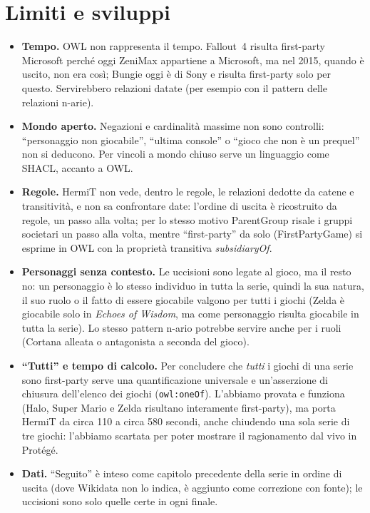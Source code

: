 \documentclass[10pt,a4paper]{article}
\newcommand{\cls}[1]{\textsf{#1}}
\newcommand{\prop}[1]{\textit{#1}}
\begin{document}
\section{Limiti e sviluppi}
\begin{itemize}
  \item \textbf{Tempo.} OWL non rappresenta il tempo. Fallout~4 risulta first-party Microsoft perché oggi ZeniMax appartiene a Microsoft, ma nel 2015, quando è uscito, non era così; Bungie oggi è di Sony e risulta first-party solo per questo. Servirebbero relazioni datate (per esempio con il pattern delle relazioni n-arie).
  \item \textbf{Mondo aperto.} Negazioni e cardinalità massime non sono controlli: ``personaggio non giocabile'', ``ultima console'' o ``gioco che non è un prequel'' non si deducono. Per vincoli a mondo chiuso serve un linguaggio come SHACL, accanto a OWL.
  \item \textbf{Regole.} HermiT non vede, dentro le regole, le relazioni dedotte da catene e transitività, e non sa confrontare date: l'ordine di uscita è ricostruito da regole, un passo alla volta; per lo stesso motivo \textsf{ParentGroup} risale i gruppi societari un passo alla volta, mentre ``first-party'' da solo (\cls{FirstPartyGame}) si esprime in OWL con la proprietà transitiva \prop{subsidiaryOf}.
  \item \textbf{Personaggi senza contesto.} Le uccisioni sono legate al gioco, ma il resto no: un personaggio è lo stesso individuo in tutta la serie, quindi la sua natura, il suo ruolo o il fatto di essere giocabile valgono per tutti i giochi (Zelda è giocabile solo in \emph{Echoes of Wisdom}, ma come personaggio risulta giocabile in tutta la serie). Lo stesso pattern n-ario potrebbe servire anche per i ruoli (Cortana alleata o antagonista a seconda del gioco).
  \item \textbf{``Tutti'' e tempo di calcolo.} Per concludere che \emph{tutti} i giochi di una serie sono first-party serve una quantificazione universale e un'asserzione di chiusura dell'elenco dei giochi (\texttt{owl:oneOf}). L'abbiamo provata e funziona (Halo, Super Mario e Zelda risultano interamente first-party), ma porta HermiT da circa 110 a circa 580 secondi, anche chiudendo una sola serie di tre giochi: l'abbiamo scartata per poter mostrare il ragionamento dal vivo in Protégé.
  \item \textbf{Dati.} ``Seguito'' è inteso come capitolo precedente della serie in ordine di uscita (dove Wikidata non lo indica, è aggiunto come correzione con fonte); le uccisioni sono solo quelle certe in ogni finale.
\end{itemize}

\label{fine:corpo}
\clearpage
\appendix

\end{document}
